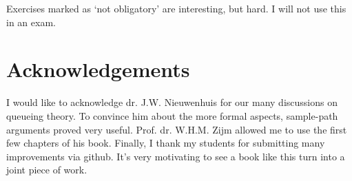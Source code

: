Exercises marked as `not obligatory' are interesting, but hard. I will not use this in an exam.

\section*{Acknowledgements}

I would like to acknowledge dr.
J.W.
Nieuwenhuis for our many discussions on queueing theory.
To convince him about the more formal aspects, sample-path arguments proved very useful.
Prof.
dr.
W.H.M.
Zijm allowed me to use the first few chapters of his book.
Finally, I thank my students for submitting many improvements via github.
It's very motivating to see a book like this turn into a joint piece of work.




